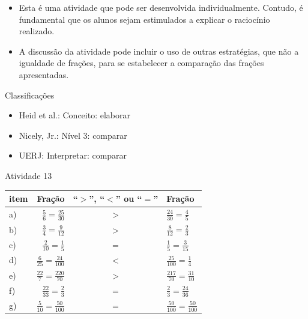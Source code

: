 \begin{multicols}{2}
  
 
\begin{itemize} %
    \item       Esta é uma atividade que pode ser desenvolvida individualmente. 
Contudo, é fundamental que os alunos sejam estimulados a explicar o raciocínio 
realizado.
    \item       A discussão da atividade pode incluir o uso de outras 
estratégias, que não a igualdade de frações, para se estabelecer a comparação 
das frações apresentadas. 
\end{itemize} %
  
  
  Classificações  
\begin{itemize} %
    \item       Heid et al.: Conceito: elaborar
    \item       Nicely, Jr.: Nível 3: comparar
    \item       UERJ: Interpretar: comparar
\end{itemize} %

\begin{resposta*}{Atividade 13}
  
\noindent
    \begin{tabular}{lrcl}
      
       item &  Fração &  ``$>$'', ``$<$'' ou ``$=$'' &  Fração \\
      \hline 
       a) &  $\frac{5}{6} = \frac{25}{30}$ &   $>$  &  $\frac{24}{30} = 
\frac{4}{5}$ \\
     
       b) &  $\frac{3}{4} = \frac{9}{12}$ &   $>$  &  $\frac{8}{12} = 
\frac{2}{3}$ \\
     
       c) &  $\frac{2}{10} = \frac{1}{5}$ &   $=$  &  $\frac{1}{5} = 
\frac{3}{15}$ \\
     
       d) &  $\frac{6}{25} = \frac{24}{100}$ &   $<$  &  $\frac{25}{100} = 
\frac{1}{4}$ \\
     
       e) &  $\frac{22}{7} = \frac{220}{70}$ &   $>$  &  $\frac{217}{70} = 
\frac{31}{10}$ \\
     
       f) &  $\frac{22}{33} = \frac{2}{3}$ &   $=$  &  $\frac{2}{3} = 
\frac{24}{36}$ \\
     
       g) &  $\frac{5}{10} = \frac{50}{100}$ &   $=$  &  $\frac{50}{100} = 
\frac{50}{100}$ \\
     

\end{tabular}
\end{resposta*}
\end{multicols}
